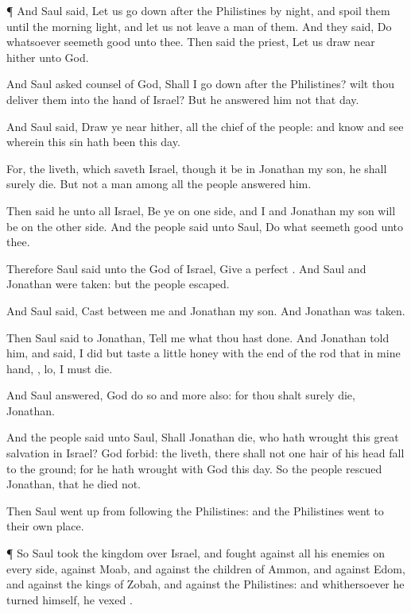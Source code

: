 {\par }{\PP {}¶ And
Saul
said, Let us go
down
after the
Philistines by
night, and
spoil them until the
morning
light, and let us not
leave a
man of them. And they
said,
Do whatsoever
seemeth
good unto thee. Then
said the
priest, Let us draw
near
hither unto
God.

And
Saul
asked counsel of
God, Shall I go
down
after the
Philistines? wilt thou
deliver them into the
hand of
Israel? But he
answered him not that
day.

And
Saul
said, Draw ye
near
hither, all the
chief of the
people: and
know and
see
wherein this
sin hath been this
day.

For,
{} the
{}
liveth, which
saveth
Israel, though it
be in
Jonathan my
son, he shall
surely
die. But
{} not a man among all the
people
{}
answered him.

Then
said he unto all
Israel, Be ye on
one
side, and I and
Jonathan my
son will be on the
other
side. And the
people
said unto
Saul,
Do what
seemeth
good unto thee.

Therefore
Saul
said unto the
{}
God of
Israel,
Give a
perfect
{}. And
Saul and
Jonathan were
taken: but the
people
escaped.

And
Saul
said,
Cast
{} between me and
Jonathan my
son. And
Jonathan was
taken.

Then
Saul
said to
Jonathan,
Tell me what thou hast
done. And
Jonathan
told him, and
said, I did
but
taste a
little
honey with the
end of the
rod that
{} in mine
hand,
{},
lo, I must
die.

And
Saul
answered,
God do
so and more
also: for thou shalt
surely
die,
Jonathan.

And the
people
said unto
Saul, Shall
Jonathan
die, who hath
wrought this
great
salvation in
Israel? God
forbid:
{} the
{}
liveth, there shall not one
hair of his
head
fall to the
ground; for he hath
wrought with
God this
day. So the
people
rescued
Jonathan, that he
died not.

Then
Saul went
up from
following the
Philistines: and the
Philistines
went to their own
place.


\par }{\PP {}¶ So
Saul
took the
kingdom over
Israel, and
fought against all his
enemies on every
side, against
Moab, and against the
children of
Ammon, and against
Edom, and against the
kings of
Zobah, and against the
Philistines: and whithersoever he
turned himself, he
vexed
{}.

}
